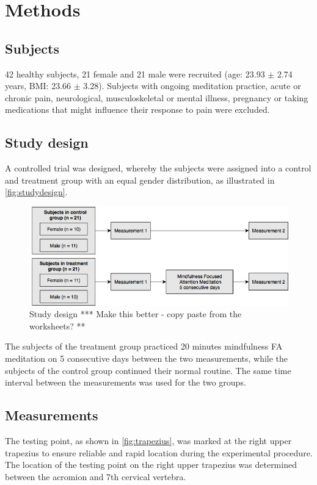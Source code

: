 \section{Methods}
\subsection{Subjects}
42 healthy subjects, 21 female and 21 male were recruited (age: 23.93 $\pm$ 2.74 years, BMI: 23.66 $\pm$ 3.28). Subjects with ongoing meditation practice, acute or chronic pain, neurological, musculoskeletal or mental illness, pregnancy or taking medications that might influence their response to pain were excluded.

\subsection{Study design}
A controlled trial was designed, whereby the subjects were assigned into a control and treatment group with an equal gender distribution, as illustrated in \autoref{fig:studydesign}.

\begin{figure}[H]
\centering
\includegraphics[width=1\columnwidth]{../figures/studydesign.png}
\caption{Study design *** Make this better - copy paste from the worksheets? **}
\label{fig:studydesign}
\end{figure} 

\noindent 
The subjects of the treatment group practiced 20 minutes mindfulness FA meditation on 5 consecutive days between the two measurements, while the subjects of the control group continued their normal routine. The same time interval between the measurements was used for the two groups.

\subsection{Measurements}%
The testing point, as shown in \autoref{fig:trapezius}, was marked at the right upper trapezius to ensure reliable and rapid location during the experimental procedure. The location of the testing point on the right upper trapezius was determined between the acromion and 7th cervical vertebra. 

